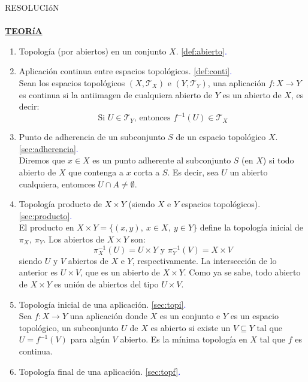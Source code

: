 \documentclass[12pt,twoside]{report}
\newcommand\mc[1]{\mathcal{#1}}
\theoremstyle{azul}
\theoremstyle{azul2}
\theoremstyle{plain}
\theoremstyle{definition}
\theoremstyle{remark}
\begin{document}
\begin{center}
\Huge{RESOLUCIóN}\\
\normalsize \; \\
    \textbf{\underline{TEORíA}}
\end{center}
\begin{enumerate}[1)]
    \item Topología (por abiertos) en un conjunto $X$. \textcolor{blue}{\ref{def:abierto}.} \\ 
    \item Aplicación continua entre espacios topológicos. \textcolor{blue}{\ref{def:conti}.} \\ Sean los espacios topológicos $(X, \mc{T}_X)$ e $(Y, \mc{T}_Y)$, una aplicación $f: X \longrightarrow Y$ es continua si la antiimagen de cualquiera abierto de $Y$ es un abierto de $X$, es decir: 
    $$\text{Si } U\in \mc{T}_Y \text{, entonces } f^{-1}(U) \in \mc{T}_X$$
    \item Punto de adherencia de un subconjunto $S$ de un espacio topológico $X$. \textcolor{blue}{\ref{sec:adherencia}.} \\
    Diremos que $x \in X$ es un punto adherente al subconjunto $S$ (en $X$) si todo abierto de $X$ que contenga a $x$ corta a $S$. Es decir, sea $U$ un abierto cualquiera, entomces $U \cap A \neq \emptyset$.
    \item Topología producto de $X \times Y$ (siendo $X$ e $Y$ espacios topológicos). \textcolor{blue}{\ref{sec:producto}.}\\ 
   El producto en $X \times Y = \{ (x,y), \: x \in X, \: y \in Y \}$ define la topología inicial de $\pi_X, \: \pi_Y$. Los abiertos de $X \times Y$ son: 
    $$\pi^{-1}_X (U)=U \times Y \text{ y }\pi^{-1}_Y (V)=X \times V $$
    siendo $U$ y $V$ abiertos de $X$ e $Y$, respectivamente. La intersección de lo anterior es $U \times V$, que es un abierto de $X \times Y$. Como ya se sabe, todo abierto de $X \times Y$ es unión de abiertos del tipo $U \times V$.
    \item Topología inicial de una aplicación. \textcolor{blue}{\ref{sec:topi}.} \\
    Sea $f: X \longrightarrow Y$ una aplicación donde $X$ es un conjunto e $Y$ es un espacio topológico, un subconjunto $U$ de $X$ es abierto si existe un $V \subseteq Y$ tal que $U=f^{-1}(V)$ para alg{\'u}n $V$ abierto. Es la mínima topología en $X$ tal que $f$ es continua.
    \item Topología final de una aplicación. \textcolor{blue}{\ref{sec:topf}.} \\ 

\end{enumerate}
\end{document}
